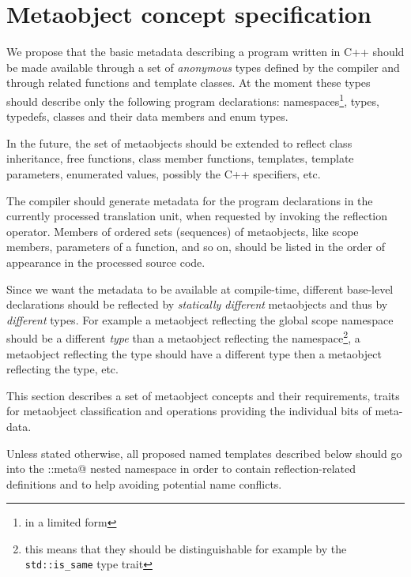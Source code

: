 \section{Metaobject concept specification}
\label{section-current-Concepts}

We propose that the basic metadata describing a program written
in C++ should be made available through a set of {\em anonymous} types
defined by the compiler and through related functions and template classes.
At the moment these types should describe only the following program
declarations: namespaces\footnote{in a limited form}, types, typedefs,
classes and their data members and enum types.

In the future, the set of metaobjects should be extended to reflect
class inheritance, free functions, class member functions, templates,
template parameters, enumerated values, possibly the C++ specifiers, etc.

The compiler should generate metadata for the program declarations
in the currently processed translation unit, when requested by invoking
the reflection operator. Members of ordered sets (sequences) of metaobjects,
like scope members, parameters of a function, and so on, should be listed
in the order of appearance in the processed source code.

Since we want the metadata to be available at compile-time,
different base-level declarations should be reflected by
{\em statically different} metaobjects and thus by {\em different} types.
For example a metaobject reflecting the global scope namespace should
be a different {\em type} than a metaobject reflecting the \verb@std@
namespace\footnote{this means that they should be distinguishable for
example by the \texttt{std::is\_same} type trait},
a metaobject reflecting the \verb@int@ type should
have a different type then a metaobject reflecting the \verb@double@
type, etc.

This section describes a set of metaobject concepts and their requirements,
traits for metaobject classification and operations providing the individual
bits of meta-data.

Unless stated otherwise, all proposed named templates described below should
go into the \verb@std::meta@ nested namespace in order to contain reflection-related
definitions and to help avoiding potential name conflicts.

























